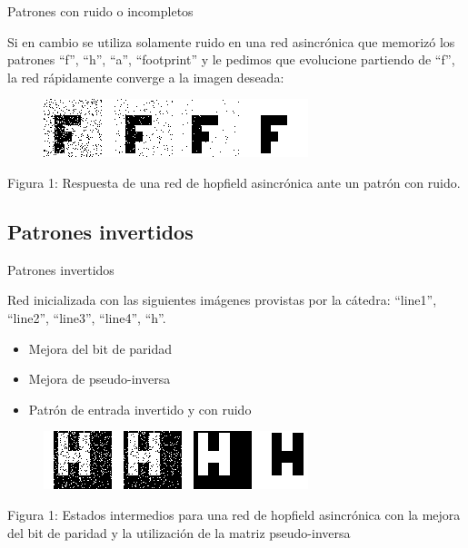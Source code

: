 \documentclass{beamer}
\begin{document}
\begin{frame}{Patrones con ruido o incompletos}

\par Si en cambio se utiliza solamente ruido en una red asincrónica que memorizó los patrones ``f'', ``h'', ``a'', ``footprint'' y le pedimos que evolucione partiendo de ``f'', la red rápidamente converge a la imagen deseada:

\begin{figure}[H]
\begin{center}
\includegraphics[scale=0.60]{./images/noisyf.png}
\label{modelado}
\end{center}
\end{figure}

\begin{center}
\par Figura 1: Respuesta de una red de hopfield asincrónica ante un patrón con ruido.
\end{center}

\end{frame}

\subsection{Patrones invertidos}

\begin{frame}{Patrones invertidos}

\par Red inicializada con las siguientes imágenes provistas por la cátedra: ``line1'', ``line2'', ``line3'', ``line4'', ``h''.\\

\begin{itemize}
\item Mejora del bit de paridad
\item Mejora de pseudo-inversa
\item Patrón de entrada invertido y con ruido
\end{itemize}

\begin{figure}[H]
\begin{center}
\includegraphics[scale=0.55]{./images/hinvypar.png}
\label{modelado}
\end{center}
\end{figure}

\begin{center}
\par Figura 1: Estados intermedios para una red de hopfield asincrónica con la mejora del bit de paridad y la utilización de la matriz pseudo-inversa
\end{center}
\end{frame}
\end{document}
